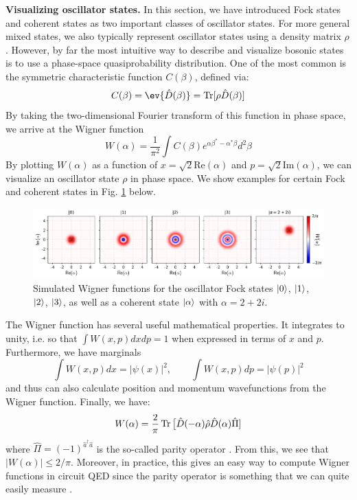 \noindent \textbf{Visualizing oscillator states.} In this section, we have introduced Fock states and coherent states as two important classes of oscillator states. For more general mixed states, we also typically represent oscillator states using a density matrix $\rho$. However, by far the most intuitive way to describe and visualize bosonic states is to use a phase-space quasiprobability distribution. One of the most common is the symmetric characteristic function $C(\beta)$, defined via: 
\begin{equation}
    C(\beta) = \ev{\hat{D}(\beta)} = \Tr[\rho \hat{D}(\beta)] 
\end{equation}
By taking the two-dimensional Fourier transform of this function in phase space, we arrive at the Wigner function
\begin{equation}
    W(\alpha) = \frac{1}{\pi^2}\int C(\beta) e^{\alpha\beta^\ast - \alpha^\ast\beta} d^2\beta
\end{equation}
By plotting $W(\alpha)$ as a function of $x = \sqrt{2}\mathrm{Re}(\alpha)$ and $p = \sqrt{2}\mathrm{Im}(\alpha)$, we can visualize an oscillator state $\rho$ in phase space. We show examples for certain Fock and coherent states in Fig. \ref{fig:2_Fock_Wigners} below. 

\begin{figure}[h]
    \centering
    \includegraphics[width=\linewidth]{Figures/2/Fock_Wigners.pdf}
    \caption{Simulated Wigner functions for the oscillator Fock states $\lvert0\rangle$, $\lvert1\rangle$, $\lvert2\rangle$, $\lvert3\rangle$, as well as a coherent state $\lvert\alpha\rangle$ with $\alpha = 2 + 2i$. }
    \label{fig:2_Fock_Wigners}
\end{figure}

The Wigner function has several useful mathematical properties. It integrates to unity, i.e. so that $\int W(x, p)dxdp = 1$ when expressed in terms of $x$ and $p$. Furthermore, we have marginals
\begin{equation}
    \int W(x, p)dx = |\psi(x)|^2, \qquad \int W(x, p)dp = |\psi(p)|^2
\end{equation}
and thus can also calculate position and momentum wavefunctions from the Wigner function. Finally, we have:
\begin{equation}
    W(\alpha) = \frac{2}{\pi}\operatorname{Tr}\big[\hat{D}(-\alpha)\hat{\rho}\hat{D}(\alpha)\hat{\Pi}]
\end{equation}
where $\hat{\Pi} = (-1)^{\hat{a}^\dagger\hat{a}}$ is the so-called parity operator \cite{royer1977wigner}. From this, we see that $|W(\alpha)| \leq 2/\pi$. Moreover, in practice, this gives an easy way to compute Wigner functions in circuit QED since the parity operator is something that we can quite easily measure \cite{sun2014tracking}. 


